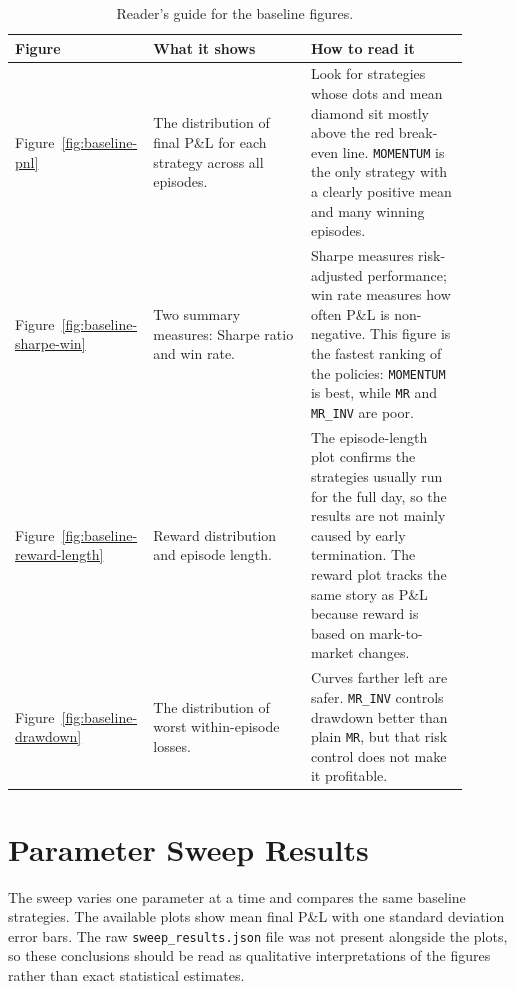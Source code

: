 \documentclass[11pt]{article}
\begin{document}
\begin{table}[H]
\centering
\small
\begin{tabular}{p{0.22\linewidth}p{0.34\linewidth}p{0.34\linewidth}}
\toprule
Figure & What it shows & How to read it \\
\midrule
Figure~\ref{fig:baseline-pnl} &
The distribution of final P\&L for each strategy across all episodes. &
Look for strategies whose dots and mean diamond sit mostly above the red
break-even line. \texttt{MOMENTUM} is the only strategy with a clearly positive
mean and many winning episodes. \\
Figure~\ref{fig:baseline-sharpe-win} &
Two summary measures: Sharpe ratio and win rate. &
Sharpe measures risk-adjusted performance; win rate measures how often P\&L is
non-negative. This figure is the fastest ranking of the policies:
\texttt{MOMENTUM} is best, while \texttt{MR} and \texttt{MR\_INV} are poor. \\
Figure~\ref{fig:baseline-reward-length} &
Reward distribution and episode length. &
The episode-length plot confirms the strategies usually run for the full day,
so the results are not mainly caused by early termination. The reward plot
tracks the same story as P\&L because reward is based on mark-to-market changes. \\
Figure~\ref{fig:baseline-drawdown} &
The distribution of worst within-episode losses. &
Curves farther left are safer. \texttt{MR\_INV} controls drawdown better than
plain \texttt{MR}, but that risk control does not make it profitable. \\
\bottomrule
\end{tabular}
\caption{Reader's guide for the baseline figures.}
\label{tab:baseline-figure-guide}
\end{table}

\section{Parameter Sweep Results}

The sweep varies one parameter at a time and compares the same baseline
strategies. The available plots show mean final P\&L with one standard deviation
error bars. The raw \texttt{sweep\_results.json} file was not present alongside
the plots, so these conclusions should be read as qualitative interpretations of
the figures rather than exact statistical estimates.
\end{document}
